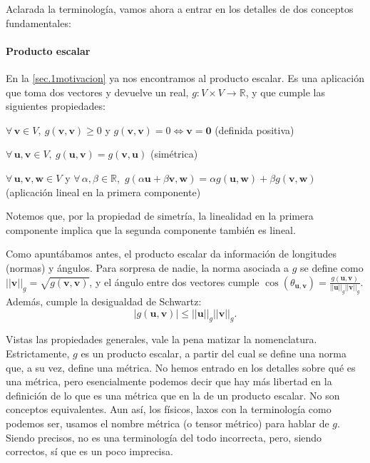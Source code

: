 Aclarada la terminología, vamos ahora a entrar en los detalles de dos conceptos fundamentales:
\paragraph{Producto escalar} En la \cref{sec.1motivacion} ya nos encontramos al producto escalar. Es una aplicación que toma dos vectores y devuelve un real, \(g:V\times V\rightarrow \mathbb{R}\), y que cumple las siguientes propiedades:
\begin{myitemize}
    \item \(\forall\, \mathbf{v}\in V,\ g(\mathbf{v},\mathbf{v})\geq0\) y \(g(\mathbf{v},\mathbf{v})=0\iff\mathbf{v}=\mathbf{0}\) (definida positiva)
    \item \(\forall\, \mathbf{u},\mathbf{v}\in V,\ g(\mathbf{u},\mathbf{v})=g(\mathbf{v},\mathbf{u})\) (simétrica)
    \item \(\forall\, \mathbf{u},\mathbf{v},\mathbf{w}\in V\) y \(\forall\,\alpha,\beta\in\mathbb{R},\) \(g(\alpha\mathbf{u}+\beta\mathbf{v},\mathbf{w})=\alpha g(\mathbf{u},\mathbf{w}) + \beta g(\mathbf{v},\mathbf{w})\) (aplicación lineal en la primera componente)
\end{myitemize}
Notemos que, por la propiedad de simetría, la linealidad en la primera componente implica que la segunda componente también es lineal. 

Como apuntábamos antes, el producto escalar da información de longitudes (normas) y ángulos. Para sorpresa de nadie, la norma asociada a \(g\) se define como \(||\mathbf{v}||_g = \sqrt{g(\mathbf{v},\mathbf{v})}\), y el ángulo entre dos vectores cumple \(\cos(\theta_{\mathbf{u},\mathbf{v}}) = \frac{g(\mathbf{u}, \mathbf{v})}{||\mathbf{u}||_g ||\mathbf{v}||_g}\). Además, cumple la desigualdad de Schwartz:
\begin{equation}
    |g(\mathbf{u},\mathbf{v})|\leq ||\mathbf{u}||_g ||\mathbf{v}||_g.
\end{equation}

Vistas las propiedades generales, vale la pena matizar la nomenclatura. Estrictamente, \(g\) es un producto escalar, a partir del cual se define una norma que, a su vez, define una métrica. No hemos entrado en los detalles sobre qué es una métrica, pero esencialmente podemos decir que hay más libertad en la definición de lo que es una métrica que en la de un producto escalar. No son conceptos equivalentes. Aun así, los físicos, laxos con la terminología como podemos ser, usamos el nombre métrica (o tensor métrico) para hablar de \(g\). Siendo precisos, no es una terminología del todo incorrecta, pero, siendo correctos, sí que es un poco imprecisa.


